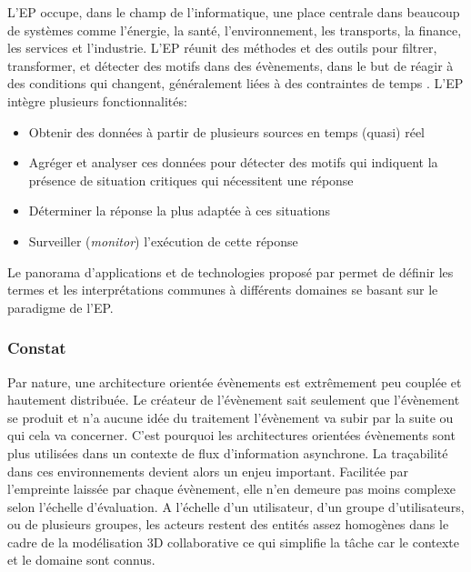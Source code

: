 L'\gls{EP} occupe, dans le champ de l'informatique, une place centrale dans 
beaucoup de systèmes comme l'énergie, la santé, l'environnement, les transports, 
la finance, les services et l'industrie. L'\gls{EP} réunit des méthodes et des outils 
pour filtrer, transformer, et détecter des motifs dans des évènements, dans le but 
de réagir à des conditions qui changent, généralement liées à des contraintes de 
temps \cite{Chandy2011}. L'\gls{EP} intègre plusieurs fonctionnalités:
\begin{itemize}
	\item Obtenir des données à partir de plusieurs sources en temps (quasi) réel
	\item Agréger et analyser ces données pour détecter des motifs qui indiquent la 
	présence de situation critiques qui nécessitent une réponse
	\item Déterminer la réponse la plus adaptée à ces situations
	\item Surveiller (\textit{monitor}) l'exécution de cette réponse
\end{itemize}

Le panorama d'applications et de technologies proposé par \cite{Hinze2009} 
permet de définir les termes et les interprétations communes à différents 
domaines se basant sur le paradigme de l'\gls{EP}. 





\subsubsection{Constat}

Par nature, une architecture orientée évènements est extrêmement peu couplée et 
hautement distribuée. Le créateur de l'évènement sait seulement que l'évènement 
se produit et n'a aucune idée du traitement l'évènement va subir par 
la suite ou qui cela va concerner. 
C'est pourquoi les architectures orientées évènements sont plus utilisées dans un 
contexte de flux d'information asynchrone. La traçabilité dans ces environnements 
devient alors un enjeu important. Facilitée par l'empreinte laissée par chaque 
évènement, elle n'en demeure pas moins complexe selon l'échelle d'évaluation. A 
l'échelle d'un utilisateur, d'un groupe d'utilisateurs, ou de plusieurs groupes, les 
acteurs restent des entités assez homogènes dans le cadre de la modélisation 3D 
collaborative ce qui simplifie la tâche car le contexte et le domaine sont 
connus.



